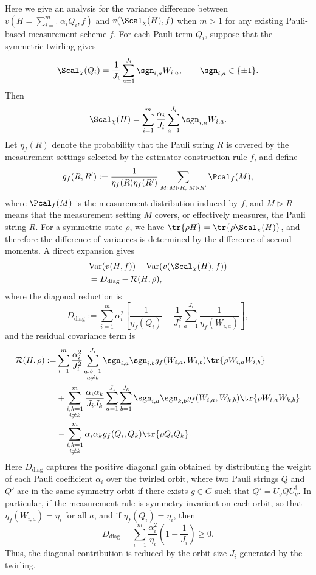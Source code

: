\documentclass[prl,aps,notitlepage,superscriptaddress,showpacs,nofootinbib]{revtex4-2}
\newcommand{\red}[1]{{\color{red} #1}}
\begin{document}
\red{Here we give an analysis for the variance difference between $v(H=\sum_{i=1}^m \alpha_i Q_i,f)$ and $v(\Scal_{\chi}(H),f)$ when $m>1$ for any existing Pauli-based measurement scheme $f$. 
For each Pauli term $Q_i$, suppose that the symmetric twirling gives
\[
    \Scal_{\chi}(Q_i)
    =
    \frac{1}{J_i}
    \sum_{a=1}^{J_i}\sgn_{i,a}W_{i,a},
    \qquad \sgn_{i,a}\in\{\pm1\}.
\]
Then
\[
    \Scal_{\chi}(H)
    =
    \sum_{i=1}^{m}
    \frac{\alpha_i}{J_i}
    \sum_{a=1}^{J_i}\sgn_{i,a}W_{i,a}.
\]
Let $\eta_f(R)$ denote the probability that the Pauli string $R$ is covered by the measurement settings selected by the estimator-construction rule $f$, and define
\[
    g_f(R,R')
    :=
    \frac{1}{\eta_f(R)\eta_f(R')}
    \sum_{M:M\triangleright R,\;M\triangleright R'}\Pcal_f(M),
\]
where $\Pcal_f(M)$ is the measurement distribution induced by $f$, and $M\triangleright R$ means that the measurement setting $M$ covers, or effectively measures, the Pauli string $R$. 
For a symmetric state $\rho$, we have $\tr{\rho H}=\tr{\rho\Scal_{\chi}(H)}$, and therefore the difference of variances is determined by the difference of second moments. 
A direct expansion gives
\[
\begin{aligned}
&\mathrm{Var}\!\left(v(H,f)\right)
-
\mathrm{Var}\!\left(v(\Scal_{\chi}(H),f)\right)
\\
&=
D_{\mathrm{diag}}
-
\mathcal R(H,\rho),
\end{aligned}
\]
where the diagonal reduction is
\[
    D_{\mathrm{diag}}
    :=
    \sum_{i=1}^{m}\alpha_i^2
    \left[
    \frac{1}{\eta_f(Q_i)}
    -
    \frac{1}{J_i^2}
    \sum_{a=1}^{J_i}
    \frac{1}{\eta_f(W_{i,a})}
    \right],
\]
and the residual covariance term is
\[
\begin{aligned}
\mathcal R(H,\rho)
:=
&
\sum_{i=1}^{m}
\frac{\alpha_i^2}{J_i^2}
\sum_{\substack{a,b=1\\a\neq b}}^{J_i}
\sgn_{i,a}\sgn_{i,b}
g_f(W_{i,a},W_{i,b})
\tr{\rho W_{i,a}W_{i,b}}
\\
&+
\sum_{\substack{i,k=1\\i\neq k}}^{m}
\frac{\alpha_i\alpha_k}{J_iJ_k}
\sum_{a=1}^{J_i}
\sum_{b=1}^{J_k}
\sgn_{i,a}\sgn_{k,b}
g_f(W_{i,a},W_{k,b})
\tr{\rho W_{i,a}W_{k,b}}
\\
&-
\sum_{\substack{i,k=1\\i\neq k}}^{m}
\alpha_i\alpha_k
g_f(Q_i,Q_k)
\tr{\rho Q_iQ_k}.
\end{aligned}
\]
Here $D_{\mathrm{diag}}$ captures the positive diagonal gain obtained by distributing the weight of each Pauli coefficient $\alpha_i$ over the twirled orbit, where two Pauli strings \(Q\) and \(Q'\) are in the same symmetry orbit if there exists \(g\in G\) such that \(Q'=U_gQU_g^\dagger\). 
In particular, if the measurement rule is symmetry-invariant on each orbit, so that $\eta_f(W_{i,a})=\eta_i$ for all $a$, and if $\eta_f(Q_i)=\eta_i$, then
\[
    D_{\mathrm{diag}}
    =
    \sum_{i=1}^{m}
    \frac{\alpha_i^2}{\eta_i}
    \left(1-\frac{1}{J_i}\right)
    \geq 0.
\]
Thus, the diagonal contribution is reduced by the orbit size $J_i$ generated by the twirling.

}
\end{document}
